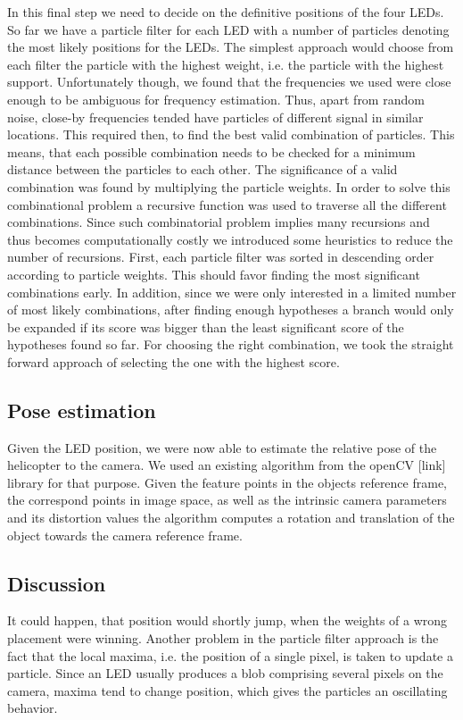 In this final step we need to decide on the definitive positions of the four LEDs. So far we have a particle filter for each LED with a number of particles denoting the most likely positions for the LEDs. The simplest approach would choose from each filter the particle with the highest weight, i.e. the particle with the highest support. Unfortunately though, we found that the frequencies we used were close enough to be ambiguous for frequency estimation. Thus, apart from random noise, close-by frequencies tended have particles of different signal in similar locations. This required then, to find the best valid combination of particles. This means, that each possible combination needs to be checked for a minimum distance between the particles to each other. The significance of a valid combination was found by multiplying the particle weights.
In order to solve this combinational problem a recursive function was used to traverse all the different combinations. Since such combinatorial problem implies many recursions and thus becomes computationally costly we introduced some heuristics to reduce the number of recursions. First, each particle filter was sorted in descending order according to particle weights. This should favor finding the most significant combinations early. In addition, since we were only interested in a limited number of most likely combinations, after finding enough hypotheses a branch would only be expanded if its score was bigger than the least significant score of the hypotheses found so far. For choosing the right combination, we took the straight forward approach of selecting the one with the highest score. 

\subsection{Pose estimation}\label{sec:poseestimation}

Given the LED position, we were now able to estimate the relative pose of the helicopter to the camera. We used an existing algorithm from the openCV [link] library for that purpose. Given the feature points in the objects reference frame, the correspond points in image space, as well as the intrinsic camera parameters and its distortion values the algorithm computes a rotation and translation of the object towards the camera reference frame.

\subsection{Discussion}

It could happen, that position would shortly jump, when the weights of a wrong placement were winning. Another problem in the particle filter approach is the fact that the local maxima, i.e. the position of a single pixel, is taken to update a particle. Since an LED usually produces a blob comprising several pixels on the camera, maxima tend to change position, which gives the particles an oscillating behavior.